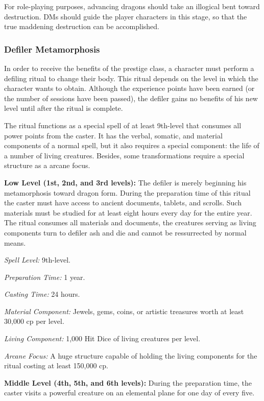 {For role-playing purposes, advancing dragons should take an illogical bent toward destruction. DMs should guide the player characters in this stage, so that the true maddening destruction can be accomplished.

\subsubsection{Defiler Metamorphosis}
\label{Defiler Metamorphosis}

In order to receive the benefits of the prestige class, a character must perform a defiling ritual to change their body. This ritual depends on the level in which the character wants to obtain. Although the experience points have been earned (or the number of sessions have been passed), the defiler gains no benefits of his new level until after the ritual is complete.

The ritual functions as a special spell of at least 9th-level that consumes all power points from the caster. It has the verbal, somatic, and material components of a normal spell, but it also requires a special component: the life of a number of living creatures. Besides, some transformations require a special structure as a arcane focus.

\textbf{Low Level (1st, 2nd, and 3rd levels):} The defiler is merely beginning his metamorphosis toward dragon form. During the preparation time of this ritual the caster must have access to ancient documents, tablets, and scrolls. Such materials must be studied for at least eight hours every day for the entire year. The ritual consumes all materials and documents, the creatures serving as living components turn to defiler ash and die and cannot be ressurrected by normal means.

\textit{Spell Level:} 9th-level.

\textit{Preparation Time:} 1 year.

\textit{Casting Time:} 24 hours.

\textit{Material Component:} Jewels, gems, coins, or artistic treasures worth at least 30,000 cp per level.

\textit{Living Component:} 1,000 Hit Dice of living creatures per level.

\textit{Arcane Focus:} A huge structure capable of holding the living components for the ritual costing at least 150,000 cp.

\textbf{Middle Level (4th, 5th, and 6th levels):} During the preparation time, the caster visits a powerful creature on an elemental plane for one day of every five.

}

